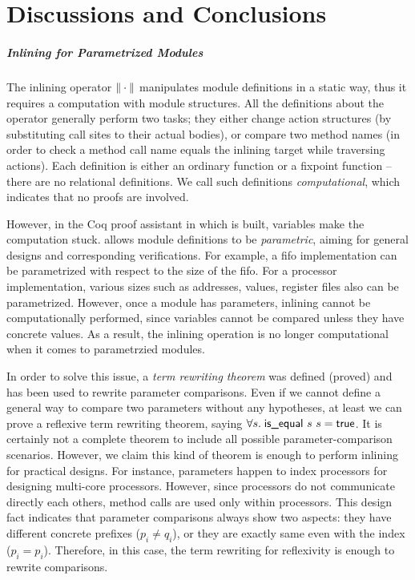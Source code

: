 \chapter{Discussions and Conclusions}
\label{chap:conclusions}

\paragraph{Inlining for Parametrized Modules}

The inlining operator $\| \cdot \|$ manipulates module definitions
in a static way, thus it requires a computation with module
structures. All the definitions about the operator generally perform
two tasks; they either change action structures (by substituting call
sites to their actual bodies), or compare two method names (in order
to check a method call name equals the inlining target while
traversing actions). Each definition is either an ordinary function or
a fixpoint function -- there are no relational definitions. We call
such definitions \emph{computational}, which indicates that no proofs
are involved.

However, in the Coq proof assistant in which \Kami{} is built,
variables make the computation stuck. \Kami{} allows module
definitions to be \emph{parametric}, aiming for general designs and
corresponding verifications. For example, a fifo implementation can be
parametrized with respect to the size of the fifo. For a processor
implementation, various sizes such as addresses, values, register
files also can be parametrized.  However, once a module has
parameters, inlining cannot be computationally performed, since
variables cannot be compared unless they have concrete values. As a
result, the inlining operation is no longer computational when it
comes to parametrzied modules.

In order to solve this issue, a \emph{term rewriting theorem} was
defined (proved) and has been used to rewrite parameter
comparisons. Even if we cannot define a general way to compare two
parameters without any hypotheses, at least we can prove a reflexive
term rewriting theorem, saying $\forall s.\; \textsf{is\_equal}\ s\ s
= \textsf{true}$. It is certainly not a complete theorem to include all
possible parameter-comparison scenarios. However, we claim this kind
of theorem is enough to perform inlining for practical designs. For
instance, parameters happen to index processors for designing
multi-core processors. However, since processors do not communicate
directly each others, method calls are used only within
processors. This design fact indicates that parameter comparisons
always show two aspects: they have different concrete prefixes ($p_i
\neq q_i$), or they are exactly same even with the index ($p_i =
p_i$). Therefore, in this case, the term rewriting for reflexivity is
enough to rewrite comparisons.

